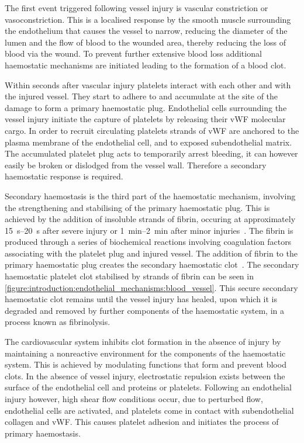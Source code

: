 The first event triggered following vessel injury is vascular constriction or vasoconstriction. This is a localised response by the smooth muscle surrounding the endothelium that causes the vessel to narrow, reducing the diameter of the lumen and the flow of blood to the wounded area, thereby reducing the loss of blood via the wound. To prevent further extensive blood loss additional haemostatic mechanisms are initiated leading to the formation of a blood clot.

Within seconds after vascular injury platelets interact with each other and with the injured vessel. They start to adhere to and accumulate at the site of the damage to form a primary haemostatic plug. Endothelial cells surrounding the vessel injury initiate the capture of platelets by releasing their vWF molecular cargo. In order to recruit circulating platelets strands of vWF are anchored to the plasma membrane of the endothelial cell, and to exposed subendothelial matrix. The accumulated platelet plug acts to temporarily arrest bleeding, it can however easily be broken or dislodged from the vessel wall. Therefore a secondary haemostatic response is required.

Secondary haemostasis is the third part of the haemostatic mechanism, involving the strengthening and stabilising of the primary haemostatic plug. This is achieved by the addition of insoluble strands of fibrin, occuring at approximately \SIrange{15}{20}{\second} after severe injury or \SIrange{1}{2}{\minute} after minor injuries~\cite{Hall2011}. The fibrin is produced through a series of biochemical reactions involving coagulation factors associating with the platelet plug and injured vessel. The addition of fibrin to the primary haemostatic plug creates the secondary haemostatic clot~\cite{Pocock2013}. The secondary haemostatic platelet clot stabilised by strands of fibrin can be seen in \autoref{figure:introduction:endothelial_mechanisms:blood_vessel}. This secure secondary haemostatic clot remains until the vessel injury has healed, upon which it is degraded and removed by further components of the haemostatic system, in a process known as fibrinolysis.

The cardiovascular system inhibits clot formation in the absence of injury by maintaining a nonreactive environment for the components of the haemostatic system. This is achieved by modulating functions that form and prevent blood clots. In the absence of vessel injury, electrostatic repulsion exists between the surface of the endothelial cell and proteins or platelets. Following an endothelial injury however, high shear flow conditions occur, due to perturbed flow, endothelial cells are activated, and platelets come in contact with subendothelial collagen and vWF. This causes platelet adhesion and initiates the process of primary haemostasis.

